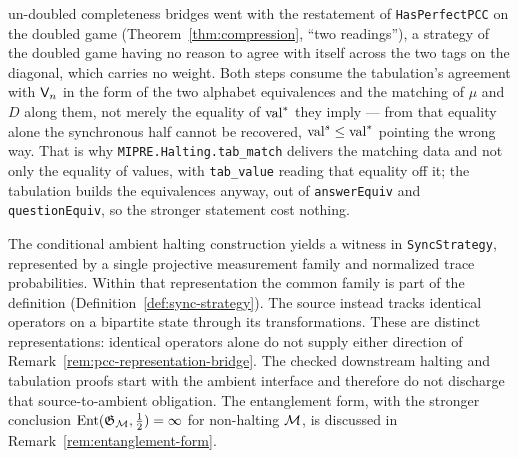 un-doubled completeness bridges went with the restatement of \texttt{HasPerfectPCC} on the
doubled game (Theorem~\ref{thm:compression}, ``two readings''), a strategy of the doubled game
having no reason to agree with itself across the two tags on the diagonal, which carries no
weight. Both steps
consume the tabulation's agreement with $\mathsf{V}_n$ in the form of the two alphabet
equivalences and the matching of $\mu$ and $D$ along them, not merely the equality of
$\mathrm{val}^*$ they imply --- from that equality alone the synchronous half cannot be recovered,
$\mathrm{val}^{s} \leq \mathrm{val}^*$ pointing the wrong way. That is why
\texttt{MIPRE.Halting.tab\_match} delivers the matching data and not only the equality of
values, with \texttt{tab\_value} reading that equality off it; the tabulation builds the
equivalences anyway, out of \texttt{answerEquiv} and \texttt{questionEquiv}, so the stronger
statement cost nothing.

\begin{remark}
\label{rem:identical-operators}
The conditional ambient halting construction yields a witness in
\texttt{SyncStrategy}, represented by a single projective measurement family and
normalized trace probabilities. Within that representation the common family is
part of the definition (Definition~\ref{def:sync-strategy}). The source instead
tracks identical operators on a bipartite state through its transformations. These
are distinct representations: identical operators alone do not supply either
direction of Remark~\ref{rem:pcc-representation-bridge}. The checked downstream
halting and tabulation proofs start with the ambient interface and therefore do
not discharge that source-to-ambient obligation. The entanglement form, with the
stronger conclusion $\mathrm{Ent}(\mathfrak{G}_{\mathcal{M}}, \frac12) = \infty$ for non-halting
$\mathcal{M}$, is discussed in Remark~\ref{rem:entanglement-form}.
\end{remark}
